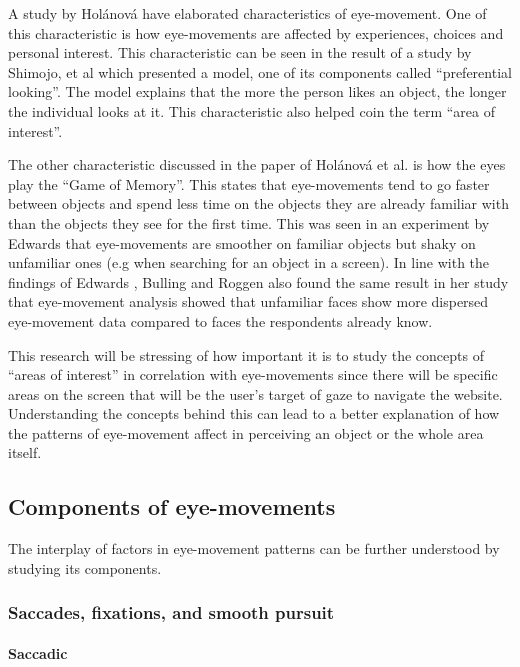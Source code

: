 \documentclass[journal]{./IEEE/IEEEtran}
\begin{document}
A study by Holánová \cite{holánová_hedberg_nilsson_1999} have elaborated characteristics of eye-movement. One of this characteristic is how eye-movements are affected by experiences, choices and personal interest. This characteristic can be seen in the result of a study by Shimojo, et al \cite{shimojo_simion_shimojo_scheier_2003} which presented a model, one of its components called ``preferential looking''. The model explains that the more the person likes an object, the longer the individual looks at it. This characteristic also helped coin the term ``area of interest''. 

The other characteristic discussed in the paper of Holánová et al. is how the eyes play the ``Game of Memory''. This states that eye-movements tend to go faster between objects and spend less time  on the objects they are already familiar with than the objects they see for the first time. This was seen in an experiment by Edwards \cite{edwards_1998} that eye-movements are smoother on familiar objects but shaky on unfamiliar ones (e.g when searching for an object in a screen). In line with the findings of Edwards \cite{edwards_1998}, Bulling and Roggen  \cite {bulling_roggen_2011}  also found the same result in her study that eye-movement analysis showed that unfamiliar faces show more dispersed eye-movement data compared to faces the respondents already know. 

This  research will be stressing of how important it is to study the concepts of ``areas of interest'' in correlation with eye-movements since there will be specific areas on the screen that will be the user’s target of gaze to navigate the website. Understanding the concepts behind this can lead to a better explanation of how the patterns of eye-movement affect in perceiving an object or the whole area itself.

\subsection{Components of eye-movements}

The interplay of factors in eye-movement patterns can be further understood by studying its components. 

\subsubsection {Saccades, fixations, and smooth pursuit}\leavevmode

\paragraph{Saccadic}\leavevmode 
\end{document}
